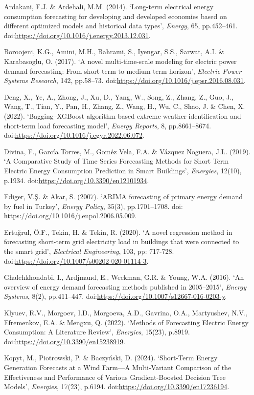 \documentclass[mstat,12pt]{unswthesis}
\begin{document}
\begin{hangparas}{.25in}{1}
Ardakani, F.J. \& Ardehali, M.M. (2014). ‘Long-term electrical energy consumption forecasting for developing and developed economies based on different optimized models and historical data types’, \textit{Energy}, 65, pp.452–461. doi:\url{https://doi.org/10.1016/j.energy.2013.12.031}.

Boroojeni, K.G., Amini, M.H., Bahrami, S., Iyengar, S.S., Sarwat, A.I. \& Karabasoglu, O. (2017). ‘A novel multi-time-scale modeling for electric power demand forecasting: From short-term to medium-term horizon’, \textit{Electric Power Systems Research}, 142, pp.58–73. doi:\url{https://doi.org/10.1016/j.epsr.2016.08.031}.

Deng, X., Ye, A., Zhong, J., Xu, D., Yang, W., Song, Z., Zhang, Z., Guo, J., Wang, T., Tian, Y., Pan, H., Zhang, Z., Wang, H., Wu, C., Shao, J. \& Chen, X. (2022). ‘Bagging–XGBoost algorithm based extreme weather identification and short-term load forecasting model’, \textit{Energy Reports}, 8, pp.8661–8674. doi:\url{https://doi.org/10.1016/j.egyr.2022.06.072}.

Divina, F., García Torres, M., Goméz Vela, F.A. \& Vázquez Noguera, J.L. (2019). ‘A Comparative Study of Time Series Forecasting Methods for Short Term Electric Energy Consumption Prediction in Smart Buildings’, \textit{Energies}, 12(10), p.1934. doi:\url{https://doi.org/10.3390/en12101934}.

Ediger, V.Ş. \& Akar, S. (2007). ‘ARIMA forecasting of primary energy demand by fuel in Turkey’, \textit{Energy Policy}, 35(3), pp.1701–1708. doi: \url{https://doi.org/10.1016/j.enpol.2006.05.009}.

Ertuğrul, Ö.F., Tekin, H. \& Tekin, R. (2020). ‘A novel regression method in forecasting short-term grid electricity load in buildings that were connected to the smart grid’, \textit{Electrical Engineering}, 103, pp: 717-728.  doi:\url{https://doi.org/10.1007/s00202-020-01114-3}.

Ghalehkhondabi, I., Ardjmand, E., Weckman, G.R. \& Young, W.A. (2016). ‘An overview of energy demand forecasting methods published in 2005–2015’, \textit{Energy Systems}, 8(2), pp.411–447. doi:\url{https://doi.org/10.1007/s12667-016-0203-y}.

Klyuev, R.V., Morgoev, I.D., Morgoeva, A.D., Gavrina, O.A., Martyushev, N.V., Efremenkov, E.A. \& Mengxu, Q. (2022). ‘Methods of Forecasting Electric Energy Consumption: A Literature Review’, \textit{Energies}, 15(23), p.8919. doi:\url{https://doi.org/10.3390/en15238919}.

Kopyt, M., Piotrowski, P. \& Baczyński, D. (2024). ‘Short-Term Energy Generation Forecasts at a Wind Farm—A Multi-Variant Comparison of the Effectiveness and Performance of Various Gradient-Boosted Decision Tree Models’, \textit{Energies}, 17(23), p.6194. doi:\url{https://doi.org/10.3390/en17236194}.


\end{hangparas}
\end{document}
